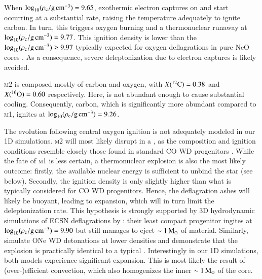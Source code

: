 \documentclass{aa}
\begin{document}
When $\logrhoc=9.65$, exothermic electron captures on  and 
 start occurring at a substantial rate, raising the temperature 
adequately to ignite carbon. In turn, this triggers oxygen burning and a thermonuclear runaway at  $\logrhoc= 9.77$. This ignition density is  lower than the   $\logrhoc\ge 9.97$ typically expected for oxygen deflagrations  in pure NeO cores \citep{Jones:2018ule}. As a consequence, severe deleptonization due to  electron captures is likely avoided. 

\textsc{m2} is composed mostly of carbon and oxygen, with $\abun{C}{12}=0.38$ and $\abun{O}{16}=0.60$ respectively. 
 Here,  is not abundant enough to cause  substantial cooling. Consequently, carbon, which is significantly more abundant compared to \textsc{m1}, ignites at $\logrhoc=9.26$. 
 
The evolution following central oxygen ignition is not adequately modeled in our 1D simulations. 
 \textsc{m2} will most likely disrupt in a \ia, as the composition and
 ignition conditions resemble closely those found in standard CO WD \ia
 progenitors \citep{Nomoto:1982zz}. While the fate of \textsc{m1} is less 
 certain, a thermonuclear explosion is also the most likely outcome: 
 firstly, the available nuclear energy is sufficient to unbind the star (see 
 below). Secondly, the ignition density is only slightly higher than  what is typically considered for CO WD \ia progenitors. 
 Hence, the deflagration ashes will likely be buoyant, leading to expansion, which will in turn limit the deleptonization rate. This hypothesis is strongly supported
 by 3D hydrodynamic  simulations of ECSN deflagrations by \cite{Jones:2018ule}: their least compact progenitor ingites at $\logrhoc=9.90$ but still manages to eject  $\sim 1\msun$ of material. 
 Similarly,  \cite{marquardt2015} simulate ONe WD detonations at lower 
 densities and demonstrate that the explosion is practically identical to a 
 typical \ia. 
 Interestingly in our 1D simulations, both models experience significant expansion. This is most likely the result of (over-)efficient convection, which also homogenizes the inner $\sim 1\msun$ of the core. 
 
 
 
 
\end{document}
